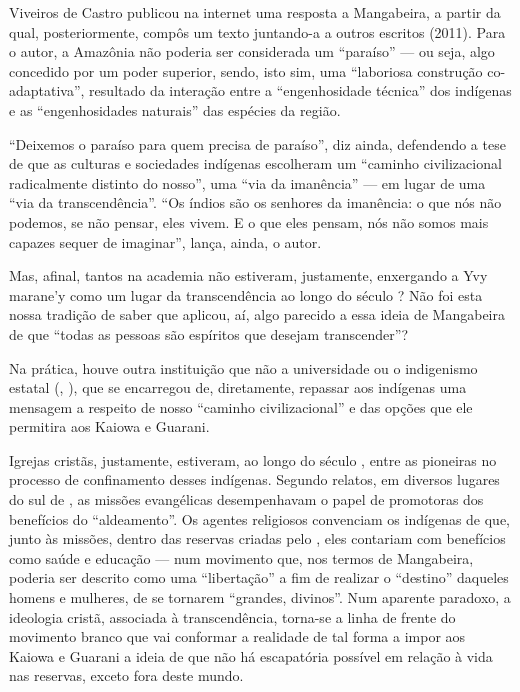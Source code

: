 Viveiros de Castro publicou na internet uma resposta a Mangabeira, a
partir da qual, posteriormente, compôs um texto juntando-a a outros
escritos (2011). Para o autor, a Amazônia não poderia ser considerada
um ``paraíso'' — ou seja, algo concedido por um poder superior, sendo,
isto sim, uma ``laboriosa construção co-adaptativa'', resultado da
interação entre a ``engenhosidade técnica'' dos indígenas e as
``engenhosidades naturais''  das espécies da região. 

``Deixemos o paraíso para quem precisa de paraíso'', diz ainda, defendendo
a tese de que as culturas e sociedades indígenas escolheram um ``caminho
civilizacional radicalmente distinto do nosso'', uma ``via da imanência''
— em lugar de uma ``via da transcendência''. ``Os índios são os senhores
da imanência: o que nós não podemos, se não pensar, eles vivem. E o que
eles pensam, nós não somos mais capazes sequer de imaginar'', lança,
ainda, o autor.

Mas, afinal, tantos na academia não estiveram, justamente, enxergando a
Yvy marane’y como um lugar da transcendência ao longo do século ? Não
foi esta nossa tradição de saber que aplicou, aí, algo parecido a essa
ideia de Mangabeira de que ``todas as pessoas são espíritos que desejam
transcender''?

Na prática, houve outra instituição que não a universidade ou o
indigenismo estatal (, ), que se encarregou de, diretamente,
repassar aos indígenas uma mensagem a respeito de nosso ``caminho
civilizacional'' e das opções que ele permitira aos Kaiowa e Guarani. 

Igrejas cristãs, justamente, estiveram, ao longo do século , entre as
pioneiras no processo de confinamento desses indígenas. Segundo
relatos, em diversos lugares do sul de , as missões evangélicas
desempenhavam o papel de promotoras dos benefícios do ``aldeamento''. Os
agentes religiosos convenciam os indígenas de que, junto às missões,
dentro das reservas criadas pelo , eles contariam com benefícios
como saúde e educação — num movimento que, nos termos de Mangabeira,
poderia ser descrito como uma ``libertação'' a fim de realizar o
``destino'' daqueles homens e mulheres, de se tornarem ``grandes,
divinos''. Num aparente paradoxo, a ideologia cristã, associada à
transcendência, torna-se a linha de frente do movimento branco que vai
conformar a realidade de tal forma a impor aos Kaiowa e Guarani a ideia
de que não há escapatória possível em relação à vida nas reservas,
exceto fora deste mundo. 

